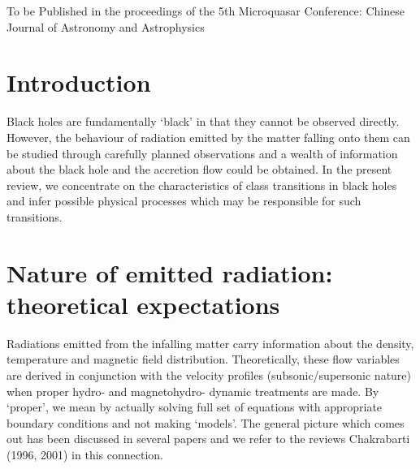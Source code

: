 \documentclass[referee]{cjaa}           %
\begin{document}
   \maketitle

\noindent To be Published in the proceedings of the 5th Microquasar Conference: 
Chinese Journal of Astronomy and Astrophysics


%
%
\section{Introduction}           %
\label{sect:intro}

Black holes are fundamentally `black' in that they cannot be observed directly.
However, the behaviour of radiation emitted by the matter falling onto them 
can be studied through carefully planned observations and a wealth of 
information about the black hole and the accretion flow could be obtained.
In the present review, we concentrate on the characteristics of class transitions 
in black holes and infer possible physical processes which may be responsible for
such transitions. 

\section{Nature of emitted radiation: theoretical expectations}

Radiations emitted from the infalling matter carry information about the 
density, temperature and magnetic field distribution. Theoretically, these flow variables are derived 
in conjunction with the velocity profiles (subsonic/supersonic nature) when proper hydro- and magnetohydro- dynamic
treatments are made.  By `proper', we mean by actually solving full set of equations 
with appropriate boundary conditions and not making `models'. The general picture which comes out has been discussed in several
papers and we refer to the reviews Chakrabarti (1996, 2001) in this connection.
\end{document}
